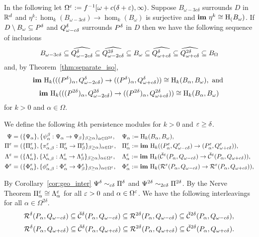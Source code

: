 
In the following let $\Omega^\e := f^{-1}[\ome + c(\of + \e),\infty)$.
Suppose $B_{\omega - 3c\delta}$ surrounds $D$ in $\R^d$ and $\eta^k : \hom_k(B_{\omega-3c\delta})\to \hom_k(B_\omega)$ is surjective and $\im~\eta^k\cong \hom_(B_\omega)$.
If $D\setminus\B\subseteq\P$ and $\Q^\of$ surrounds $\P$ in $D$ then we have the following sequence of inclusions
\[ B_{\omega - 3c\delta}\subseteq \widehat{Q_{\omega-2c\delta}^\delta}\subseteq \widehat{Q_{\omega-2c\delta}^{2\delta}}\subseteq \B\subseteq \widehat{\QQ^\delta}\subseteq\widehat{\QQ^{2\delta}}\subseteq B_{\Omega}\]
and, by Theorem~\ref{thm:separate_iso},
\[\im~\hom_k(((\P)_\alpha,Q_{\omega-2c\delta}^\of)\to ((\P)_\alpha,\QQ^\of))\cong\hom_k(B_\alpha, B_\omega),\text{ and }\]
\[\im~\hom_k(((P^{2\delta})_\alpha,Q_{\omega-2c\delta}^{2\of})\to ((P^{2\of})_\alpha,\QQ^{2\of}))\cong\hom_k(B_\alpha, B_\omega)\]
for $k > 0$ and $\alpha\in\Omega$.

We define the following $k$th persistence modules for $k > 0$ and $\e \geq\delta$.
\begin{align*}
  \Psi &= (\{\Psi_\alpha\}, \{\psi_\alpha^\beta : \Psi_\alpha\to \Psi_\beta\}_{\beta\geq \alpha})_{\alpha\in\Omega^{2\delta}}, & &\Psi_\alpha := \hom_k(B_\alpha, \B),\\
  \Pi^\e &= (\{\Pi^\e_\alpha\}, \{\pi^\e_{\alpha,\beta} : \Pi^\e_\alpha\to \Pi^\e_\beta\}_{\beta\geq \alpha})_{\alpha\in\Omega^\e}, & &\Pi^\e_\alpha := \im~\hom_k((P^\e_\alpha, \Q^\e)\to (P^\e_\alpha, \QQ^\e)),\\
  \Lambda^\e &= (\{\Lambda^\e_\alpha\}, \{\lambda^\e_{\alpha,\beta} : \Lambda^\e_\alpha\to \Lambda^\e_\beta\}_{\beta\geq \alpha})_{\alpha\in\Omega^\e}, & &\Lambda^\e_\alpha := \im~\hom_k(\cech^\e(P_\alpha, \Q)\to \cech^\e(P_\alpha, \QQ)),\\
  \Phi^\e &= (\{\Phi^\e_\alpha\}, \{\phi^\e_{\alpha, \beta} : \Phi^\e_\alpha\to \Phi^\e_\beta\}_{\beta\geq \alpha})_{\alpha\in\Omega^\e}, & &\Phi^\e_\alpha := \im~\hom_k(\rips^\e(P_\alpha, \Q)\to \rips^\e(P_\alpha, \QQ)),
\end{align*}


By Corollary~\ref{cor:geo_inter} $\Psi^\delta\sim_{c\of} \Pi^\delta$ and $\Psi^{2\delta}\sim_{2c\of} \Pi^{2\delta}$.
By the Nerve Theorem $\Pi^\e_\alpha\cong\Lambda^\e_\alpha$ for all $\e > 0$ and $\alpha\in\Omega^\e$.
We have the following interleavings for all $\alpha \in\Omega^{2\delta}$.
\[ \rips^\delta(P_\alpha, \Q)\subseteq \cech^\delta(P_\alpha, \Q) \subseteq \rips^{2\delta}(P_\alpha, \Q)\subseteq \cech^{2\delta}(P_\alpha, \Q),\]
\[ \rips^\delta(P_\alpha, \QQ)\subseteq \cech^\delta(P_\alpha, \QQ) \subseteq \rips^{2\delta}(P_\alpha, \QQ)\subseteq \cech^{2\delta}(P_\alpha, \QQ).\]


